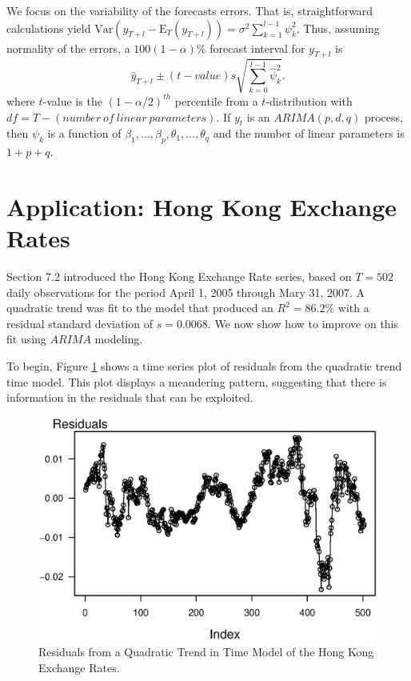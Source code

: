 We focus on the variability of the forecasts errors. That is,
straightforward calculations yield $\mathrm{Var}\left(
y_{T+l}-\mathrm{E}_T \left( y_{T+l}\right) \right)
=\sigma^2\sum_{k=1}^{l-1}\psi_{k}^2$. Thus, assuming normality of
the errors, a $100(1-\alpha) \%$ forecast interval for $y_{T+l}$ is
\begin{equation*}
\widehat{y}_{T+l} \pm (t-value) s \sqrt{\sum_{k=0}^{l-1}
\widehat{\psi}_k^2} .
\end{equation*}
where $t$-value is the $(1-\alpha /2)^{th}$ percentile from a
$t$-distribution with $df=T-(number~of~linear~parameters)$. If $y_t$
is an $ARIMA(p,d,q)$ process, then $\psi_{k}$ is a function of
$\beta_1,\ldots,\beta_p,\theta_1,\ldots,\theta_q$ and the number of
linear parameters is $1+p+q$.

\section{Application: Hong Kong Exchange Rates}

Section 7.2 introduced the Hong Kong Exchange Rate series, based on
$T=502$ daily observations for the period April 1, 2005 through Mary
31, 2007. A quadratic trend was fit to the model that produced an
$R^2=86.2\%$ with a residual standard deviation of $s=0.0068$. We
now show how to improve on this fit using $ARIMA$ modeling.

To begin, Figure \ref{F8:HKResids} shows a time series plot of
residuals from the quadratic trend time model. This plot displays a
meandering pattern, suggesting that there is information in the
residuals that can be exploited.

\begin{figure}[htp]
  \begin{center}
   \includegraphics[width=.8\textwidth]{Chapter8AutoReg/HKResids.eps}
   \caption{\label{F8:HKResids} \small Residuals from a Quadratic Trend in Time
Model of the Hong Kong Exchange Rates.}
  \end{center}
\end{figure}



